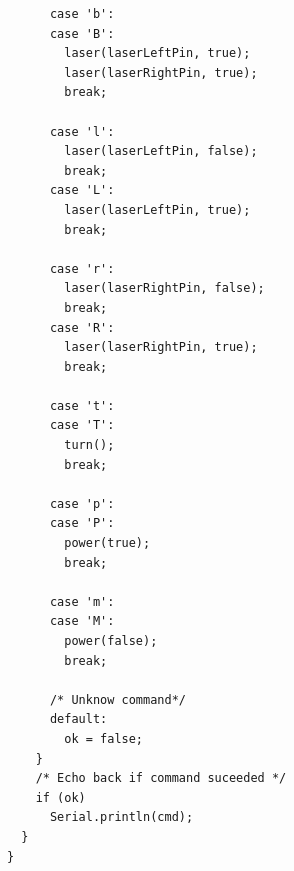\documentclass[a4paper,10pt]{report}
\begin{document}
\begin{lstlisting}
      case 'b':
      case 'B':
        laser(laserLeftPin, true);
        laser(laserRightPin, true);
        break;

      case 'l':
        laser(laserLeftPin, false);
        break;
      case 'L':
        laser(laserLeftPin, true);
        break;

      case 'r':
        laser(laserRightPin, false);
        break;
      case 'R':
        laser(laserRightPin, true);
        break;

      case 't':
      case 'T':
        turn();
        break;

      case 'p':
      case 'P':
        power(true);
        break;

      case 'm':
      case 'M':
        power(false);
        break;

      /* Unknow command*/
      default: 
        ok = false;
    }
    /* Echo back if command suceeded */
    if (ok) 
      Serial.println(cmd);
  }      
}
\end{lstlisting}

\listoffigures
\end{document}
